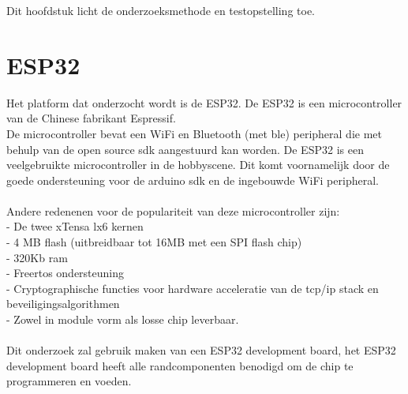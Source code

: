 \documentclass[../DCM2_Verslag.tex]{subfiles}
\begin{document}
Dit hoofdstuk licht de onderzoeksmethode en testopstelling toe. 

\section{ESP32}
Het platform dat onderzocht wordt is de ESP32. De ESP32 is een microcontroller van de Chinese fabrikant Espressif.\\ De microcontroller bevat een WiFi en Bluetooth (met ble) peripheral die met behulp van de open source sdk aangestuurd kan worden. De ESP32 is een veelgebruikte microcontroller in de hobbyscene. Dit komt voornamelijk door de goede ondersteuning voor de arduino sdk en de ingebouwde WiFi peripheral.
\\\\
Andere redenenen voor de populariteit van deze microcontroller zijn:\\
- De twee xTensa lx6 kernen\\
- 4 MB flash (uitbreidbaar tot 16MB met een SPI flash chip)\\
- 320Kb ram\\
- Freertos ondersteuning\\
- Cryptographische functies voor hardware acceleratie van de tcp/ip stack en beveiligingsalgorithmen\\
- Zowel in module vorm als losse chip leverbaar.\\\\
Dit onderzoek zal gebruik maken van een ESP32 development board, het ESP32 development board heeft alle randcomponenten benodigd om de chip te programmeren en voeden. \\
\end{document}
